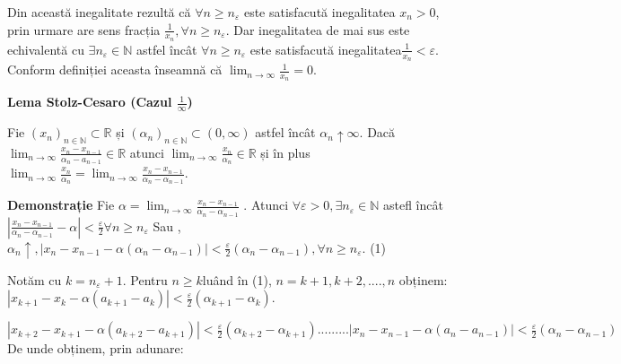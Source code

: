 \documentclass[a4paper,12pt,oneside]{report}
\begin{document}
Din această inegalitate rezultă că \(\forall n\geq n_{\varepsilon }\) este satisfacută inegalitatea \(x_{n}> 0\), prin urmare are sens fracția \(\frac{1}{x_{n}}, \forall n\geq n_{\varepsilon }\). Dar inegalitatea de mai sus este echivalentă cu \(\exists n_{\varepsilon }\in \mathbb{N}\) astfel încât \(\forall n\geq n_{\varepsilon }\) este satisfacută inegalitatea\( \frac{1}{x_{n}}< \varepsilon.\) Conform definiției aceasta înseamnă că \(\lim_{n \to \infty }\frac{1}{x_{n}}=0\).


\textbf{Lema Stolz-Cesaro (Cazul \(\frac{1}{\infty }\))}

Fie \(\left ( x_{n} \right )_{n\in \mathbb{N}}\subset \mathbb{R}\) și \(\left (\alpha _{n} \right )_{n\in \mathbb{N}}\subset \left ( 0,\infty \right )\) astfel încât \(\alpha _{n} \uparrow \infty\). 
Dacă \(\lim_{n \to \infty }\frac{x_{n} - x_{n-1}}{\alpha _{n}-a_{n-1}}\in \mathbb{R}\) atunci \(\lim_{n \to \infty }\frac{x_{n}}{ \alpha _{n}}\in \mathbb{R}\) și în plus \(\lim_{n \to \infty }\frac{x_{n}}{ \alpha _{n}}= \lim_{n \to \infty }\frac{x_{n} - x_{n-1}}{ \alpha _{n}- \alpha _{n-1}} \).

\textbf{Demonstrație} 
Fie \(\alpha = \lim_{n \to \infty }\frac{x_{n}-x_{n-1}}{\alpha _{n}-\alpha _{n-1}}\) . 
Atunci \(\forall \varepsilon > 0,\exists n_{\varepsilon }\in \mathbb{N}\) astefl încât \(\left | \frac{x_{n}-x_{n-1}}{\alpha _{n}- \alpha _{n-1}} - \alpha \right |< \frac{\varepsilon }{2} \forall  n\geq n_{\varepsilon  }\)
Sau , \(\alpha _{n} \uparrow, 
\left | x_{n}- x_{n-1 }- \alpha \left ( \alpha _{n}-\alpha _{n-1} \right ) \right | < \frac{\varepsilon }{2}\left ( \alpha _{n}- \alpha _{n-1} \right ), \forall n\geq n_{\varepsilon }\). (1) 

Notăm cu \(k=n_{\varepsilon }+1\). Pentru \(n\geq k \)luând în (1), \(n= k+1, k+2,....,n\) obținem:
\(\left | x_{k+1} - x_{k} - \alpha \left ( a_{k+1}- a_{k} \right ) \right |< \frac{\varepsilon }{2}\left ( \alpha _{k+1} - \alpha _{k} \right )\). 

\(\left | x_{k+2} - x_{k+1} - \alpha \left ( a_{k+2}- a_{k+1} \right ) \right |< \frac{\varepsilon }{2}\left ( \alpha _{k+2} - \alpha _{k+1} \right )
...
...
...
\left | x_{n} - x_{n-1} - \alpha \left ( a_{n}- a_{n-1} \right ) \right |< \frac{\varepsilon }{2}\left ( \alpha _{n} - \alpha _{n-1} \right )\)
De unde obținem, prin adunare:
















\setlength{\baselineskip}{\normalbaselineskip}
\setlength{\parskip}{0pt}

\end{document}
